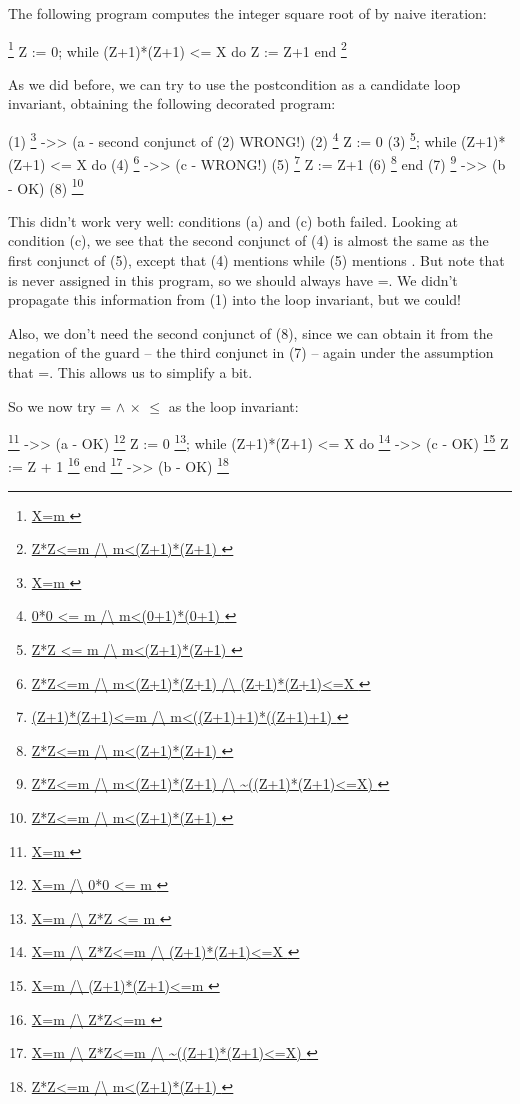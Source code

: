 \documentclass[12pt]{report}
\begin{document}
 The following program computes the integer square root of 
    by naive iteration:


    \footnote{\url{ X=m }}
      Z := 0;
      while (Z+1)*(Z+1) <= X do
        Z := Z+1
      end
    \footnote{\url{ Z*Z<=m /\ m<(Z+1)*(Z+1) }}


 As we did before, we can try to use the postcondition as a
    candidate loop invariant, obtaining the following decorated program:


    (1)  \footnote{\url{ X=m }} ->>                  (a - second conjunct of (2) WRONG!)
    (2)  \footnote{\url{ 0*0 <= m /\ m<(0+1)*(0+1) }}
            Z := 0
    (3)            \footnote{\url{ Z*Z <= m /\ m<(Z+1)*(Z+1) }};
            while (Z+1)*(Z+1) <= X do
    (4)            \footnote{\url{ Z*Z<=m /\ m<(Z+1)*(Z+1)
                             /\ (Z+1)*(Z+1)<=X }} ->>          (c - WRONG!)
    (5)            \footnote{\url{ (Z+1)*(Z+1)<=m /\ m<((Z+1)+1)*((Z+1)+1) }}
              Z := Z+1
    (6)            \footnote{\url{ Z*Z<=m /\ m<(Z+1)*(Z+1) }}
            end
    (7)  \footnote{\url{ Z*Z<=m /\ m<(Z+1)*(Z+1) /\ ~((Z+1)*(Z+1)<=X) }} ->>    (b - OK)
    (8)  \footnote{\url{ Z*Z<=m /\ m<(Z+1)*(Z+1) }}


    This didn't work very well: conditions (a) and (c) both failed.
    Looking at condition (c), we see that the second conjunct of (4)
    is almost the same as the first conjunct of (5), except that (4)
    mentions  while (5) mentions . But note that  is never
    assigned in this program, so we should always have =. We
    didn't propagate this information from (1) into the loop
    invariant, but we could!


    Also, we don't need the second conjunct of (8), since we can
    obtain it from the negation of the guard -- the third conjunct
    in (7) -- again under the assumption that =.  This allows
    us to simplify a bit.


    So we now try = \ensuremath{\land} \ensuremath{\times} \ensuremath{\le}  as the loop invariant:


    \footnote{\url{ X=m }} ->>                                           (a - OK)
    \footnote{\url{ X=m /\ 0*0 <= m }}
      Z := 0
                 \footnote{\url{ X=m /\ Z*Z <= m }};
      while (Z+1)*(Z+1) <= X do
                 \footnote{\url{ X=m /\ Z*Z<=m /\ (Z+1)*(Z+1)<=X }} ->>  (c - OK)
                 \footnote{\url{ X=m /\ (Z+1)*(Z+1)<=m }}
        Z := Z + 1
                 \footnote{\url{ X=m /\ Z*Z<=m }}
      end
    \footnote{\url{ X=m /\ Z*Z<=m /\ ~((Z+1)*(Z+1)<=X) }} ->>            (b - OK)
    \footnote{\url{ Z*Z<=m /\ m<(Z+1)*(Z+1) }}
\end{document}
